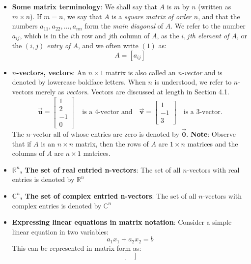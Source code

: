 \documentclass{report}
\begin{document}
\begin{itemize}
\[             \]
         \item \textbf{Some matrix terminology}:
             We shall say that $A$ is $m$ by $n$ (written as $m \times n$). If $m = n$, we say that $A$ is a \textit{square matrix of order $n$}, and that the numbers $a_{11}, a_{22}, \dots, a_{nn}$ form the \textit{main diagonal} of $A$. We refer to the number $a_{ij}$, which is in the $i$th row and $j$th column of $A$, as the \textit{$i,j$th element of $A$}, or the \textit{$(i,j)$ entry of $A$}, and we often write $(1)$ as:
             \[
                 A = [a_{ij}]
             \]
         \item \textbf{$n$-vectors, vectors}:
             An $n \times 1$ matrix is also called an \textit{n-vector} and is denoted by lowercase boldface letters. When $n$ is understood, we refer to $n$-vectors merely as \textit{vectors}. Vectors are discussed at length in Section 4.1.
             \[
                 \vec{\mathbf{u}} = \begin{bmatrix} 1 \\ 2 \\ -1 \\ 0 \end{bmatrix} \quad \text{is a 4-vector and} \quad \vec{\mathbf{v}} = \begin{bmatrix} 1 \\ -1 \\ 3 \end{bmatrix} \quad \text{is a 3-vector.}
             \]
             The $n$-vector all of whose entries are zero is denoted by $\vec{\mathbf{0}}$.
             \bigbreak \noindent 
             \textbf{Note}: Observe that if $A$ is an $n \times n$ matrix, then the rows of $A$ are $1 \times n$ matrices and the columns of $A$ are $n \times 1$ matrices. 
         \item \textbf{$\mathbb{R}^{n}$, The set of real entried n-vectors}: The set of all $n$-vectors with real entries is denoted by $\mathbb{R}^{n}$
         \item \textbf{$\mathbb{C}^{n}$, The set of complex entried n-vectors}: The set of all $n$-vectors with complex entries is denoted by $\mathbb{C}^{n}$
         \item \textbf{Expressing linear equations in matrix notation}:
             Consider a simple linear equation in two variables:
             \[
                 a_1x_1 + a_2x_2 = b
             \]
             This can be represented in matrix form as:
             \[
                 \begin{bmatrix}

\end{bmatrix}\]
\end{itemize}
\end{document}
